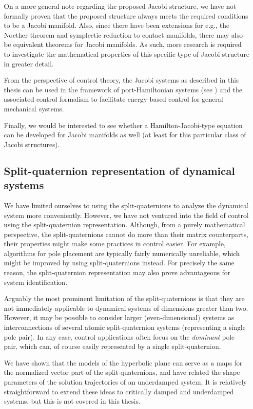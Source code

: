 On a more general note regarding the proposed Jacobi structure, we have not formally proven that the proposed structure always meets the required conditions to be a Jacobi manifold. Also, since there have been extensions for e.g., the Noether theorem and symplectic reduction to contact manifolds, there may also be equivalent theorems for Jacobi manifolds. As such, more research is required to investigate the mathematical properties of this specific type of Jacobi structure in greater detail.

From the perspective of control theory, the Jacobi systems as described in this thesis can be used in the framework of port-Hamiltonian systems (see \citet{VanDerSchaft2006}) and the associated control formalism to facilitate energy-based control for general mechanical systems.

Finally, we would be interested to see whether a Hamilton-Jacobi-type equation can be developed for Jacobi manifolds as well (at least for this particular class of Jacobi structures).

\subsection*{Split-quaternion representation of dynamical systems}
We have limited ourselves to using the split-quaternions to analyze the dynamical system more conveniently. However, we have not ventured into the field of control using the split-quaternion representation. Although, from a purely mathematical perspective, the split-quaternions cannot do more than their matrix counterparts, their properties might make some practices in control easier. For example, algorithms for pole placement are typically fairly numerically unreliable, which might be improved by using split-quaternions instead. For precisely the same reason, the split-quaternion representation may also prove advantageous for system identification.

Arguably the most prominent limitation of the split-quaternions is that they are not immediately applicable to dynamical systems of dimensions greater than two. However, it may be possible to consider larger (even-dimensional) systems as interconnections of several atomic split-quaternion systems (representing a single pole pair). In any case, control applications often focus on the \emph{dominant} pole pair, which can, of course easily represented by a single split-quaternion.

We have shown that the models of the hyperbolic plane can serve as a maps for the normalized vector part of the split-quaternions, and have related the shape parameters of the solution trajectories of an underdamped system. It is relatively straightforward to extend these ideas to critically damped and underdamped systems, but this is not covered in this thesis. 

